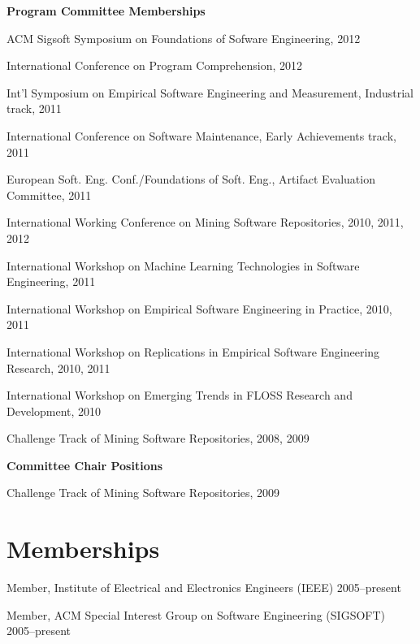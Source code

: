 \documentclass[margin,line,article,letterpaper]{res}
\newenvironment{noindentlist}{
  \begin{list}{}{%
      \setlength{\itemsep}{0in}
      \setlength{\parsep}{0in} \setlength{\parskip}{0in}
      \setlength{\topsep}{0in} \setlength{\partopsep}{0in} 
      \setlength{\leftmargin}{0in}}}{\end{list}}
\newenvironment{list1}{
  \begin{list}{}{%
      \setlength{\itemsep}{0in}
      \setlength{\parsep}{0in} \setlength{\parskip}{0in}
      \setlength{\topsep}{0in} \setlength{\partopsep}{0in} 
      \setlength{\leftmargin}{0.17in}}}{\end{list}}
\newenvironment{list2}{
  \begin{list}{$\bullet$}{%
      \setlength{\itemsep}{0in}
      \setlength{\parsep}{0in} \setlength{\parskip}{0in}
      \setlength{\topsep}{0in} \setlength{\partopsep}{0in} 
      \setlength{\leftmargin}{0.2in}}}{\end{list}}
\begin{document}
\begin{resume}
\textbf{Program Committee Memberships}
\begin{list1}
\item ACM Sigsoft Symposium on Foundations of Sofware Engineering, 2012
\item International Conference on Program Comprehension, 2012
\item Int'l Symposium on Empirical Software Engineering and Measurement, Industrial track, 2011
\item International Conference on Software Maintenance, Early Achievements track, 2011
\item European Soft. Eng. Conf./Foundations of Soft. Eng., Artifact Evaluation Committee, 2011
\item International Working Conference on Mining Software Repositories, 2010, 2011, 2012
\item International Workshop on Machine Learning Technologies in Software Engineering, 2011
\item International Workshop on Empirical Software Engineering in Practice, 2010, 2011
\item International Workshop on Replications in Empirical Software Engineering Research, 2010, 2011
\item International Workshop on Emerging Trends in FLOSS Research and Development, 2010
\item Challenge Track of Mining Software Repositories, 2008, 2009
\end{list1}

\textbf{Committee Chair Positions}
\begin{list1}
\item Challenge Track of Mining Software Repositories, 2009
\end{list1}

\section{Memberships}
\begin{noindentlist}
\item Member, Institute of Electrical and Electronics Engineers (IEEE) \hfill 2005--present
\item Member, ACM Special Interest Group on Software Engineering (SIGSOFT) \hfill 2005--present
\end{noindentlist}



\begin{comment}
I don't think anyone cares about this
\section{Technical Skills} 
\begin{list2}
\item Proficient:  C, Java, Python, C++, PostgreSQL, MySQL, Ruby, R, \LaTeX
\item Familiar: Lisp, Prolog, C\#, SML
\end{list2}
\end{comment}


\end{resume}
\end{document}
